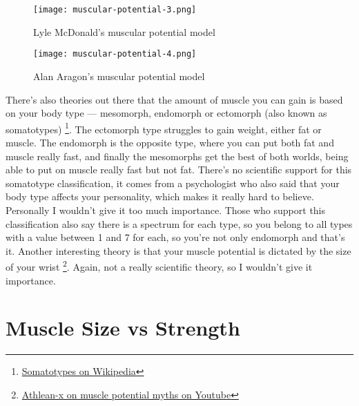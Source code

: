 \documentclass[openany, 12pt]{book}
\begin{document}
        \begin{figure}[h]
		\centering
		\texttt{[image: muscular-potential-3.png]}
		\caption{Lyle McDonald's muscular potential model}
		\label{fig17}
	\end{figure}

        \begin{figure}[h!]
		\centering
		\texttt{[image: muscular-potential-4.png]}
		\caption{Alan Aragon's muscular potential model}
		\label{fig18}
	\end{figure}
        
        There's also theories out there that the amount of muscle you can gain is based on your body type ---
        mesomorph, endomorph or ectomorph (also known as somatotypes)
        \footnote{\href{https://en.wikipedia.org/wiki/Somatotype_and_constitutional_psychology}{Somatotypes on Wikipedia}}. The ectomorph type struggles to gain weight, either fat or muscle.
        The endomorph is the opposite type, where you can put both fat and muscle really fast, and finally the mesomorphs get the best of both worlds, being able to put on muscle really fast
        but not fat. There's no scientific support for this somatotype classification, it comes from a psychologist who also said that your body type affects your personality, which makes it
        really hard to believe. Personally I wouldn't give it too much importance. Those who support this classification also say there is a spectrum for each type, so you belong to all types
        with a value between 1 and 7 for each, so you're not only endomorph and that's it. Another interesting theory is that your muscle potential is dictated by the size of your wrist
        \footnote{\href{https://www.youtube.com/watch?v=xLrNHB5O6f8}{Athlean-x on muscle potential myths on Youtube}}. Again, not a really scientific theory, so I wouldn't give it importance.

        \section{Muscle Size vs Strength}
\end{document}
